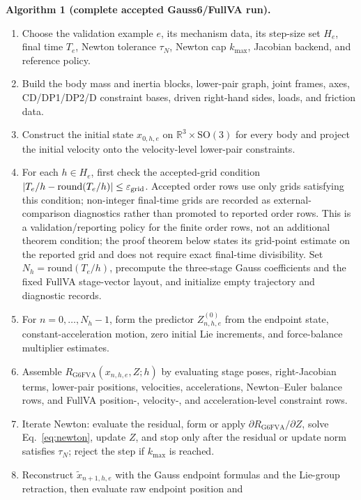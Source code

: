 \documentclass[preprint,12pt]{elsarticle}
\newcommand{\method}{Gauss6\slash FullVA}
\begin{document}
\noindent\textbf{Algorithm 1 (complete accepted \method{} run).}
\begin{enumerate}
  \item Choose the validation example $e$, its mechanism data, its step-size
  set $H_e$, final time $T_e$, Newton tolerance $\tau_N$, Newton cap
  $k_{\max}$, Jacobian backend, and reference policy.
  \item Build the body mass and inertia blocks, lower-pair graph, joint
  frames, axes, CD/DP1/DP2/D constraint bases, driven right-hand sides, loads,
  and friction data.
  \item Construct the initial state $x_{0,h,e}$ on
  $\mathbb R^3\times\mathrm{SO}(3)$ for every body and project the initial
  velocity onto the velocity-level lower-pair constraints.
  \item For each $h\in H_e$, first check the accepted-grid condition
  $|T_e/h-\mathrm{round}(T_e/h)|\le\varepsilon_{\rm grid}$. Accepted order
  rows use only grids satisfying this condition; non-integer final-time grids
  are recorded as external-comparison diagnostics rather than promoted to reported
  order rows. This is a validation/reporting policy for the finite order
  rows, not an additional theorem condition; the proof theorem below states
  its grid-point estimate on the reported grid and does not require exact
  final-time divisibility. Set $N_h=\mathrm{round}(T_e/h)$, precompute the three-stage
  Gauss coefficients and the fixed FullVA stage-vector layout, and initialize
  empty trajectory and diagnostic records.
  \item For $n=0,\ldots,N_h-1$, form the predictor $Z^{(0)}_{n,h,e}$ from the
  endpoint state, constant-acceleration motion, zero initial Lie increments,
  and force-balance multiplier estimates.
  \item Assemble $R_{\mathrm{G6FVA}}(x_{n,h,e},Z;h)$ by evaluating stage
  poses, right-Jacobian terms, lower-pair positions, velocities,
  accelerations, Newton--Euler balance rows, and FullVA position-, velocity-,
  and acceleration-level constraint rows.
  \item Iterate Newton: evaluate the residual, form or apply
  $\partial R_{\mathrm{G6FVA}}/\partial Z$, solve
  Eq.~\eqref{eq:newton}, update $Z$, and stop only after the residual or
  update norm satisfies $\tau_N$; reject the step if $k_{\max}$ is reached.
  \item Reconstruct $\widetilde{x}_{n+1,h,e}$ with the Gauss endpoint formulas
  and the Lie-group retraction, then evaluate raw endpoint position and

\end{enumerate}
\end{document}

